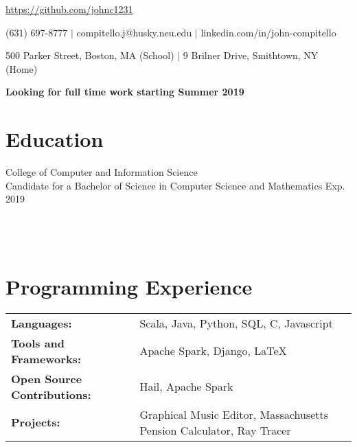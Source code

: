 \documentclass[12pt]{john_resume}
\begin{document}
\centerline{\url{https://github.com/johnc1231}}
\centerline{(631) 697-8777 $|$ compitello.j@husky.neu.edu $|$ linkedin.com/in/john-compitello}
\centerline{500 Parker Street, Boston, MA (School) $|$ 9 Brilner Drive, Smithtown, NY (Home)}
\centerline{\textbf{Looking for full time work starting Summer 2019}}

\section{Education}
College of Computer and Information Science\\
Candidate for a Bachelor of Science in Computer Science and Mathematics \hspace*{\fill} Exp. 2019 \\
 \\
\\
 \\

\section{Programming Experience}
\begin{tabular}{l l}
\textbf{Languages:} & Scala, Java, Python, SQL, C, Javascript\\
\textbf{Tools and Frameworks:} & Apache Spark, Django, LaTeX \\
\textbf{Open Source Contributions:} & Hail, Apache Spark \\
\textbf{Projects:} & Graphical Music Editor, Massachusetts Pension Calculator, Ray Tracer
\end{tabular}
\end{document}
